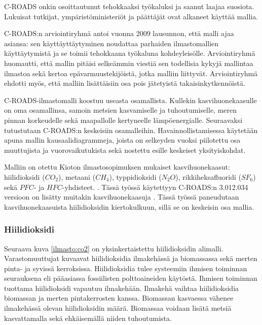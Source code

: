 \documentclass[finnish,12pt,a4paper,pdftex]{article}
\begin{document}
\begin{onehalfspacing}
C-ROADS onkin osoittautunut tehokkaaksi työkaluksi ja saanut laajaa suosiota. Lukuisat tutkijat, ympäristöministeriöt ja päättäjät ovat alkaneet käyttää mallia. \cite{CroadsWWW, CroadsFlightSimulator2011} 

C-ROADS:n arviointiryhmä antoi vuonna 2009 lausunnon, että malli ajaa asiansa: sen käyttäyttäytyminen noudattaa parhaiden ilmastomallien käyttäytymistä ja se toimii tehokkaana työkaluna kohdeyleisölle. Arviointiryhmä huomautti, että mallin pitäisi selkeämmin viestiä sen todellisia kykyjä mallintaa ilmastoa sekä kertoa epävarmuustekijöistä, jotka malliin liittyvät. Arviointiryhmä ehdotti myös, että malliin lisättäisiin osa pois jätetyistä takaisinkytkennöistä. \cite{Watson2009}

C-ROADS-ilmastomalli koostuu useasta osamallista. Kullekin kasvihuonekaasulle on oma osamallinsa, samoin metsien kasvamiselle ja tuhoutumiselle, meren pinnan korkeudelle sekä maapallolle kertyneelle lämpöenergialle. \cite{Croads, CroadsFlightSimulator2011} Seuraavaksi tutustutaan C-ROADS:n keskeisiin osamalleihin. Havainnollistamisessa käytetään apuna mallin kausaalidiagrammeja, joista on selkeyden vuoksi piilotettu osa muuttujista ja vuorovaikutukista sekä nostettu esille keskeiset yksityiskohdat.

Malliin on otettu Kioton ilmastosopimuksen \cite{KyotoManual} mukaiset kasvihuonekaasut: hiilidioksidi ($CO_2$), metaani ($CH_4$), typpidioksidi ($N_2O$), rikkiheksafluoridi ($SF_6$) sekä $PFC$- ja $HFC$-yhdisteet. \cite{Croads, CroadsFlightSimulator2011}. Tässä työssä käytettyyn C-ROADS:n 3.012.034 versioon on lisätty muitakin kasvihuonekaasuja \cite{Croads}. Tässä työssä paneudutaan kasvihuonekaasuista hiilidioksidin kiertokulkuun, sillä se on keskeisin osa mallia. 

\subsubsection*{Hiilidioksidi \label{ilmasto:croads:co2}}

Seuraava kuva \ref{ilmasto:co2} on yksinkertaistettu hiilidioksidin alimalli. Varastomuuttujat kuvaavat hiilidioksidia ilmakehässä ja biomassassa sekä merten pinta- ja syvissä kerroksissa. Hiilidioksidia tulee systeemiin ihmisen toiminnan seurauksena eli pääasiassa fossiilisten polttoaineiden käytöstä. Ihmisen toiminnan tuottama hiilidioksidi vapautuu ilmakehään. Ilmakehä vaihtaa hiilidioksidia biomassan ja merten pintakerrosten kanssa. Biomassan kasvaessa vähenee ilmakehässä olevan hiilidioksidin määrä. Biomassaa voidaan lisätä metsiä kasvattamalla sekä ehkäisemällä niiden tuhoutumista. \cite{Croads, CroadsFlightSimulator2011}


\end{onehalfspacing}
\end{document}
